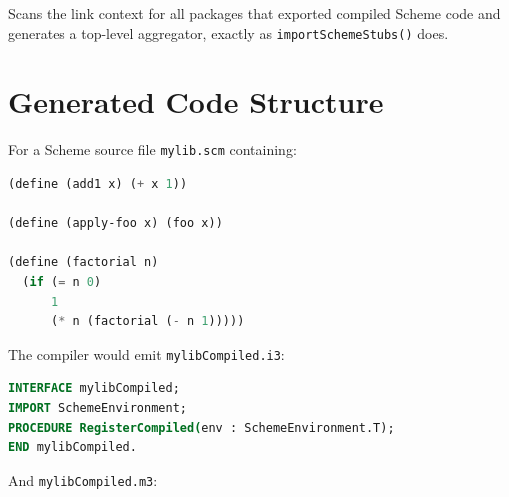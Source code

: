 \documentclass[12pt]{report}
\begin{document}
Scans the link context for all packages that exported compiled
Scheme code and generates a top-level aggregator, exactly as
\texttt{importSchemeStubs()} does.

\section{Generated Code Structure}

For a Scheme source file \texttt{mylib.scm} containing:

\begin{lstlisting}[language=Scheme]
(define (add1 x) (+ x 1))

(define (apply-foo x) (foo x))

(define (factorial n)
  (if (= n 0)
      1
      (* n (factorial (- n 1)))))
\end{lstlisting}

The compiler would emit \texttt{mylibCompiled.i3}:

\begin{lstlisting}[language=Modula3]
INTERFACE mylibCompiled;
IMPORT SchemeEnvironment;
PROCEDURE RegisterCompiled(env : SchemeEnvironment.T);
END mylibCompiled.
\end{lstlisting}

And \texttt{mylibCompiled.m3}:
\end{document}
